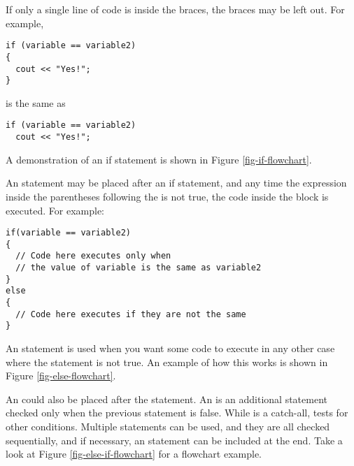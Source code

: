 If only a single line of code is inside the braces, the braces may be left out. 
For example,

\noindent\begin{minipage}{\linewidth}\begin{lstlisting}
if (variable == variable2)
{
  cout << "Yes!";
}
\end{lstlisting}\end{minipage}

\noindent is the same as

\noindent\begin{minipage}{\linewidth}\begin{lstlisting}
if (variable == variable2)
  cout << "Yes!";
\end{lstlisting}\end{minipage}

A demonstration of an if statement is shown in Figure \ref{fig-if-flowchart}.


An  statement may be placed after an if statement, and any time the expression inside the parentheses following the  is not true, the code inside the  block is executed. 
For example:

\noindent\begin{minipage}{\linewidth}\begin{lstlisting}
if(variable == variable2)
{
  // Code here executes only when
  // the value of variable is the same as variable2
}
else
{
  // Code here executes if they are not the same
}
\end{lstlisting}\end{minipage}

An  statement is used when you want some code to execute in any other case where the  statement is not true. 
An example of how this works is shown in Figure \ref{fig-else-flowchart}.


An  could also be placed after the  statement. 
An  is an additional  statement checked only when the previous  statement is false. 
While  is a catch-all,  tests for other conditions. 
Multiple  statements can be used, and they are all checked sequentially, and if necessary, an  statement can be included at the end. 
Take a look at Figure \ref{fig-else-if-flowchart} for a flowchart example.

